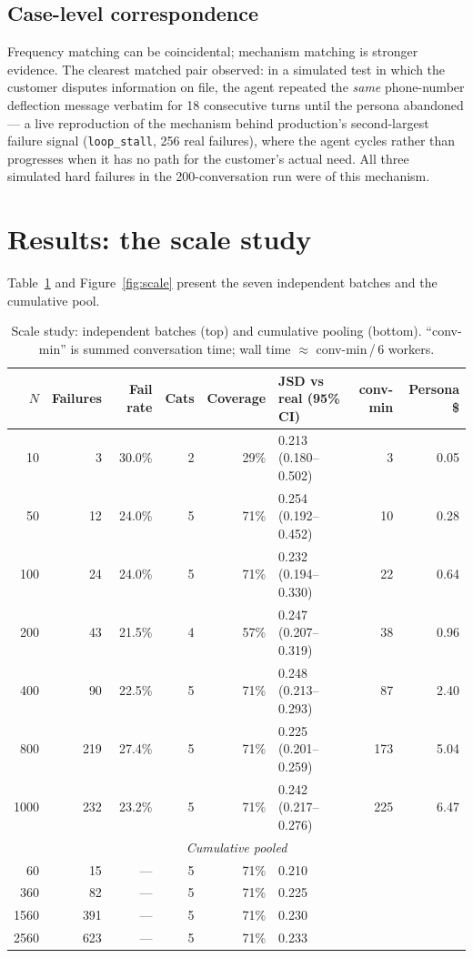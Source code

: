 \documentclass[11pt,a4paper]{article}
\newcommand{\cat}[1]{\texttt{#1}}
\begin{document}
\subsection{Case-level correspondence}
Frequency matching can be coincidental; mechanism matching is stronger evidence. The clearest
matched pair observed: in a simulated test in which the customer disputes information on file,
the agent repeated the \emph{same} phone-number deflection message verbatim for 18 consecutive
turns until the persona abandoned --- a live reproduction of the mechanism behind production's
second-largest failure signal (\cat{loop\_stall}, 256 real failures), where the agent cycles
rather than progresses when it has no path for the customer's actual need. All three simulated
hard failures in the 200-conversation run were of this mechanism.

\section{Results: the scale study}
\label{sec:scale}

Table~\ref{tab:scale} and Figure~\ref{fig:scale} present the seven independent batches and the
cumulative pool.

\begin{table}[H]
\centering
\caption{Scale study: independent batches (top) and cumulative pooling (bottom).
``conv-min'' is summed conversation time; wall time $\approx$ conv-min\,/\,6 workers.}
\label{tab:scale}
\begin{tabular}{rrrrrlrr}
\toprule
$N$ & Failures & Fail rate & Cats & Coverage & JSD vs real (95\% CI) & conv-min & Persona \$ \\
\midrule
10   &   3 & 30.0\% & 2 & 29\% & 0.213 (0.180--0.502) &   3 & 0.05 \\
50   &  12 & 24.0\% & 5 & 71\% & 0.254 (0.192--0.452) &  10 & 0.28 \\
100  &  24 & 24.0\% & 5 & 71\% & 0.232 (0.194--0.330) &  22 & 0.64 \\
200  &  43 & 21.5\% & 4 & 57\% & 0.247 (0.207--0.319) &  38 & 0.96 \\
400  &  90 & 22.5\% & 5 & 71\% & 0.248 (0.213--0.293) &  87 & 2.40 \\
800  & 219 & 27.4\% & 5 & 71\% & 0.225 (0.201--0.259) & 173 & 5.04 \\
1000 & 232 & 23.2\% & 5 & 71\% & 0.242 (0.217--0.276) & 225 & 6.47 \\
\midrule
\multicolumn{8}{c}{\emph{Cumulative pooled}}\\
\midrule
60    &  15 & --- & 5 & 71\% & 0.210 & & \\
360   &  82 & --- & 5 & 71\% & 0.225 & & \\
1560  & 391 & --- & 5 & 71\% & 0.230 & & \\
2560  & 623 & --- & 5 & 71\% & 0.233 & & \\
\bottomrule
\end{tabular}
\end{table}
\end{document}
